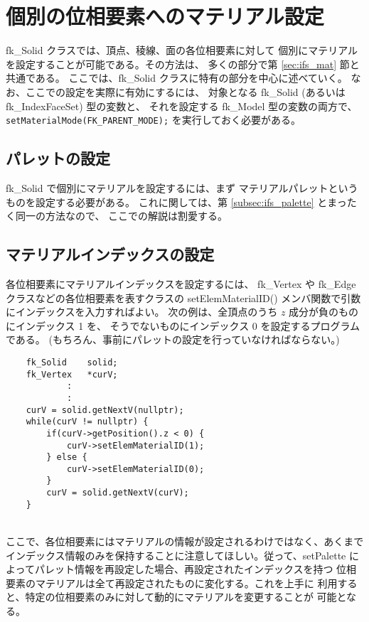 \section{個別の位相要素へのマテリアル設定}
fk\_Solid クラスでは、頂点、稜線、面の各位相要素に対して
個別にマテリアルを設定することが可能である。その方法は、
多くの部分で第 \ref{sec:ifs_mat} 節と共通である。
ここでは、fk\_Solid クラスに特有の部分を中心に述べていく。
なお、ここでの設定を実際に有効にするには、
対象となる fk\_Solid (あるいは fk\_IndexFaceSet) 型の変数と、
それを設定する fk\_Model 型の変数の両方で、
\verb+setMaterialMode(FK_PARENT_MODE);+ を実行しておく必要がある。

\subsection{パレットの設定} \label{subsec:solid_palette}
fk\_Solid で個別にマテリアルを設定するには、まず
マテリアルパレットというものを設定する必要がある。
これに関しては、第 \ref{subsec:ifs_palette} とまったく同一の方法なので、
ここでの解説は割愛する。

\subsection{マテリアルインデックスの設定} \label{subsec:solid_matid}
各位相要素にマテリアルインデックスを設定するには、
fk\_Vertex や fk\_Edge クラスなどの各位相要素を表すクラスの
setElemMaterialID() メンバ関数で引数にインデックスを入力すればよい。
次の例は、全頂点のうち \(z\) 成分が負のものにインデックス 1 を、
そうでないものにインデックス 0 を設定するプログラムである。
(もちろん、事前にパレットの設定を行っていなければならない。)
\\
\begin{breakbox}
\begin{verbatim}
    fk_Solid    solid;
    fk_Vertex   *curV;
            :
            :
    curV = solid.getNextV(nullptr);
    while(curV != nullptr) {
        if(curV->getPosition().z < 0) {
            curV->setElemMaterialID(1);
        } else {
            curV->setElemMaterialID(0);
        }
        curV = solid.getNextV(curV);
    }
\end{verbatim}
\end{breakbox}
~ \\
ここで、各位相要素にはマテリアルの情報が設定されるわけではなく、あくまで
インデックス情報のみを保持することに注意してほしい。従って、setPalette
によってパレット情報を再設定した場合、再設定されたインデックスを持つ
位相要素のマテリアルは全て再設定されたものに変化する。これを上手に
利用すると、特定の位相要素のみに対して動的にマテリアルを変更することが
可能となる。

